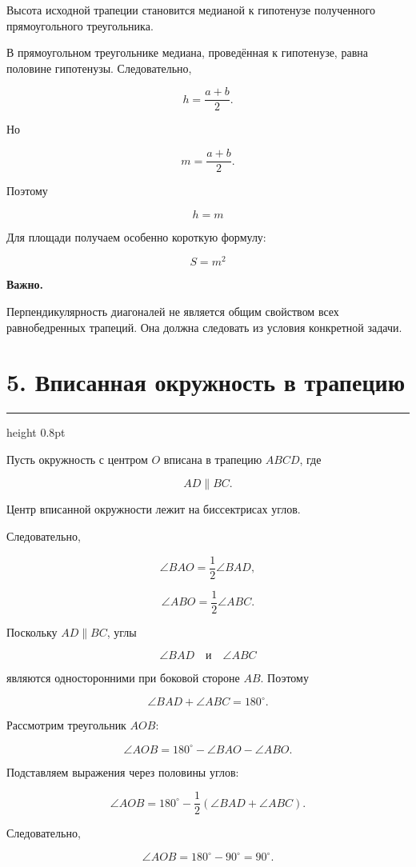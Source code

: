 \documentclass[a4paper,12pt]{article}
\newcommand{\sectionline}{
  \par
  \vspace{0.2em}
  {\color{accent}\hrule height 0.8pt}
  \vspace{0.7em}
}
\newcommand{\important}[1]{
  \textbf{\color{darkaccent}#1}
}
\newcommand{\formula}[1]{
  \[
  \boxed{#1}
  \]
}
\begin{document}
Высота исходной трапеции становится медианой к гипотенузе полученного
прямоугольного треугольника.

В прямоугольном треугольнике медиана, проведённая к гипотенузе,
равна половине гипотенузы. Следовательно,

\[
h
=
\frac{a+b}{2}.
\]

Но

\[
m
=
\frac{a+b}{2}.
\]

Поэтому

\formula{
h=m
}

Для площади получаем особенно короткую формулу:

\formula{
S=m^2
}

\important{Важно.}
Перпендикулярность диагоналей не является общим свойством всех
равнобедренных трапеций. Она должна следовать из условия конкретной задачи.


\section*{5. Вписанная окружность в трапецию}
\sectionline

Пусть окружность с центром $O$ вписана в трапецию $ABCD$, где

\[
AD\parallel BC.
\]

Центр вписанной окружности лежит на биссектрисах углов.

Следовательно,

\[
\angle BAO
=
\frac12\angle BAD,
\]

\[
\angle ABO
=
\frac12\angle ABC.
\]

Поскольку $AD\parallel BC$, углы

\[
\angle BAD
\quad\text{и}\quad
\angle ABC
\]

являются односторонними при боковой стороне $AB$. Поэтому

\[
\angle BAD+\angle ABC=180^\circ.
\]

Рассмотрим треугольник $AOB$:

\[
\angle AOB
=
180^\circ
-
\angle BAO
-
\angle ABO.
\]

Подставляем выражения через половины углов:

\[
\angle AOB
=
180^\circ
-
\frac12
\left(
\angle BAD+\angle ABC
\right).
\]

Следовательно,

\[
\angle AOB
=
180^\circ-90^\circ
=
90^\circ.
\]
\end{document}
